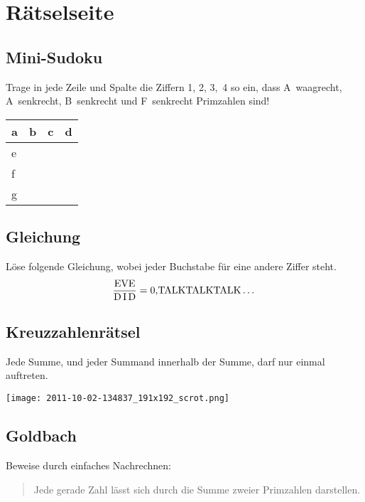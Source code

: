 ﻿\chapter{Rätselseite}

\raggedcolumns
\begin{multicols}{2}
	\section*{Mini-Sudoku}
	Trage in jede Zeile und Spalte die Ziffern 1, 2, 3,~4 so ein, dass A~waagrecht, A~senkrecht, B~senkrecht und F~senkrecht Primzahlen sind!

	\begin{center}
		\begin{tabular}{ |p{0.8cm}|p{0.8cm}|p{0.8cm}|p{0.8cm}| }
		\hline
		  a & b & c & d \\[0.8cm]
		\hline
		  e &   &   &   \\[0.8cm]
		\hline
		  f &   &   &   \\[0.8cm]
		\hline
		  g &   &   &   \\[0.8cm]
		\hline
		\end{tabular}
	\end{center}

	\section*{Gleichung}
	Löse folgende Gleichung, wobei jeder Buchstabe für eine andere Ziffer steht.
	\[\frac{\textrm{EVE}}{\textrm{D\,I\,D}} = \textrm{0,TALKTALKTALK}\dots\]

		\columnbreak
		\columnbreak
	\section*{Kreuzzahlenrätsel}
	Jede Summe, und jeder Summand innerhalb der Summe, darf nur einmal auftreten.

	\texttt{[image: 2011-10-02-134837\_191x192\_scrot.png]}

	\section*{Goldbach}
	Beweise durch einfaches Nachrechnen:
	\begin{quote}
		Jede gerade Zahl lässt sich durch die Summe zweier Primzahlen darstellen.
	\end{quote}

	\end{multicols}
